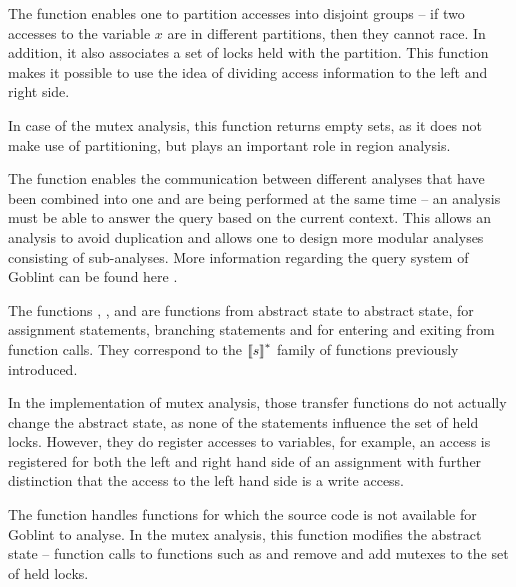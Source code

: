 \documentclass[..thesis.tex]{subfiles}
\begin{document}
The  function enables one to partition accesses into disjoint groups -- if two accesses to the variable $x$ are in different partitions, then they cannot race. In addition, it also associates a set of locks held with the partition. This function makes it possible to use the idea of dividing access information to the left and right side.

In case of the mutex analysis, this function returns empty sets, as it does not make use of partitioning, but plays an important role in region analysis.


The  function enables the communication between different analyses that have been combined into one and are being performed at the same time -- 
an analysis must be able to answer the query based on the current context. This allows an analysis to avoid duplication and allows one to design more modular analyses consisting of sub-analyses. More information regarding the query system of Goblint can be found here .

The functions , ,  and  are functions from abstract state to abstract state, for assignment statements,
branching statements and for entering and exiting from function calls. They correspond to the $\left\llbracket s \right\rrbracket^{*}$ family of functions previously introduced.

In the implementation of mutex analysis, those transfer functions do not actually change the abstract state, as none of the statements influence the set of held locks.
However, they do register accesses to variables, for example, an access is registered for both the left and right hand side of an assignment with further distinction
that the access to the left hand side is a write access.

The  function handles functions for which the source code is not available for Goblint to analyse. In the mutex analysis,
this function modifies the abstract state -- function calls to functions such as  and  
remove and add mutexes to the set of held locks.
\end{document}

